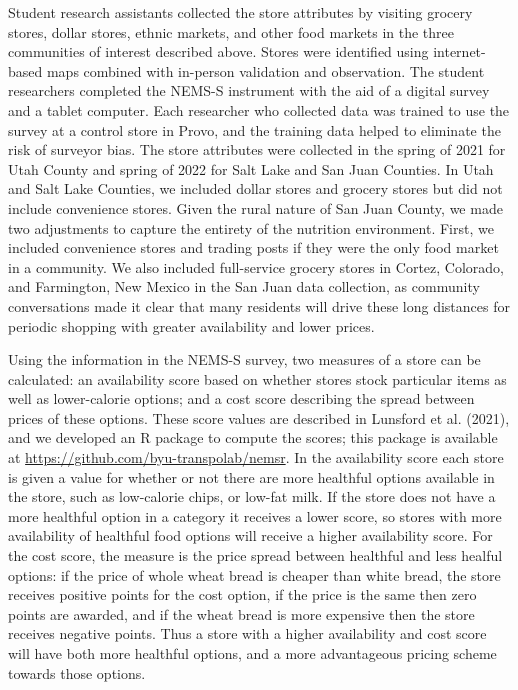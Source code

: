 \documentclass[
  letterpaper,
  DIV=11,
  numbers=noendperiod]{scrreport}
\begin{document}
Student research assistants collected the store attributes by visiting
grocery stores, dollar stores, ethnic markets, and other food markets in
the three communities of interest described above. Stores were
identified using internet-based maps combined with in-person validation
and observation. The student researchers completed the NEMS-S instrument
with the aid of a digital survey and a tablet computer. Each researcher
who collected data was trained to use the survey at a control store in
Provo, and the training data helped to eliminate the risk of surveyor
bias. The store attributes were collected in the spring of 2021 for Utah
County and spring of 2022 for Salt Lake and San Juan Counties. In Utah
and Salt Lake Counties, we included dollar stores and grocery stores but
did not include convenience stores. Given the rural nature of San Juan
County, we made two adjustments to capture the entirety of the nutrition
environment. First, we included convenience stores and trading posts if
they were the only food market in a community. We also included
full-service grocery stores in Cortez, Colorado, and Farmington, New
Mexico in the San Juan data collection, as community conversations made
it clear that many residents will drive these long distances for
periodic shopping with greater availability and lower prices.

Using the information in the NEMS-S survey, two measures of a store can
be calculated: an availability score based on whether stores stock
particular items as well as lower-calorie options; and a cost score
describing the spread between prices of these options. These score
values are described in Lunsford et al. (2021), and we developed an R
package to compute the scores; this package is available at
\url{https://github.com/byu-transpolab/nemsr}. In the availability score
each store is given a value for whether or not there are more healthful
options available in the store, such as low-calorie chips, or low-fat
milk. If the store does not have a more healthful option in a category
it receives a lower score, so stores with more availability of healthful
food options will receive a higher availability score. For the cost
score, the measure is the price spread between healthful and less
healful options: if the price of whole wheat bread is cheaper than white
bread, the store receives positive points for the cost option, if the
price is the same then zero points are awarded, and if the wheat bread
is more expensive then the store receives negative points. Thus a store
with a higher availability and cost score will have both more healthful
options, and a more advantageous pricing scheme towards those options.
\end{document}
